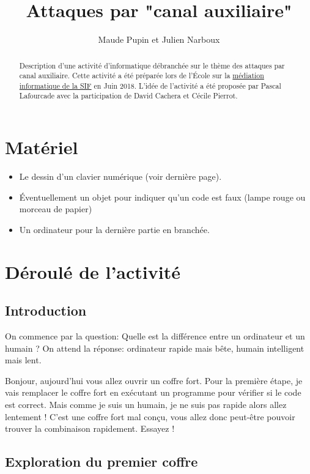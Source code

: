 \documentclass[a4paper]{article}
\title{Attaques par "canal auxiliaire"}
\author{Maude Pupin et Julien Narboux}
\newcommand{\guill}[1]{\og{}#1\fg{}}
\begin{document}
\maketitle

\begin{abstract}
Description d'une activité d'informatique débranchée sur le thème des attaques par \guill{canal auxiliaire}.
Cette activité a été préparée lors de l’École sur la \href{https://www.societe-informatique-de-france.fr/ecole-mediation-scientifique-en-informatique/}{médiation informatique de la SIF} en Juin 2018.  L'idée de l'activité a été proposée par Pascal Lafourcade avec la participation de David Cachera et Cécile Pierrot.
\end{abstract}

\section{Matériel}

\begin{itemize}
\item Le dessin d'un clavier numérique (voir dernière page).
\item Éventuellement un objet pour indiquer qu'un code est faux (lampe rouge ou morceau de papier)  
\item Un ordinateur pour la dernière partie en branchée.
\end{itemize}

\section{Déroulé de l'activité}

\subsection{Introduction}
On commence par la question: \guill{Quelle est la différence entre un ordinateur et un humain ?}
On attend la réponse: \guill{ordinateur rapide mais bête, humain intelligent mais lent}.

\guill{Bonjour, aujourd'hui vous allez ouvrir un coffre fort.
Pour la première étape, je vais remplacer le coffre fort en exécutant un programme pour vérifier si le code est correct.
Mais comme je suis un humain, je ne suis pas rapide alors allez lentement !
C'est une coffre fort mal conçu, vous allez donc peut-être pouvoir trouver la combinaison rapidement. Essayez !}

\subsection{Exploration du premier coffre}
\end{document}
